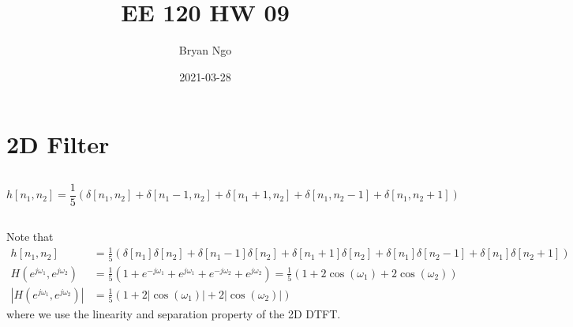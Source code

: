 \documentclass{article}
\title{EE 120 HW 09}
\author{Bryan Ngo}
\date{2021-03-28}
\begin{document}
\maketitle

\section{2D Filter}

\subsection{}

\begin{equation}
    h[n_1, n_2] = \frac{1}{5} (\delta[n_1, n_2] + \delta[n_1 - 1, n_2] + \delta[n_1 + 1, n_2] + \delta[n_1, n_2 - 1] + \delta[n_1, n_2 + 1])
\end{equation}

\subsection{}

Note that
\begin{align}
    h[n_1, n_2] &= \frac{1}{5} (\delta[n_1] \delta[n_2] + \delta[n_1 - 1] \delta[n_2] + \delta[n_1 + 1] \delta[n_2] + \delta[n_1] \delta[n_2 - 1] + \delta[n_1] \delta[n_2 + 1]) \\
    H(e^{j \omega_1}, e^{j \omega_2}) &= \frac{1}{5} (1 + e^{-j \omega_1} + e^{j \omega_1} + e^{-j \omega_2} + e^{j \omega_2}) = \frac{1}{5} (1 + 2\cos(\omega_1) + 2\cos(\omega_2)) \\
    |H(e^{j \omega_1}, e^{j \omega_2})| &= \frac{1}{5} (1 + 2|\cos(\omega_1)| + 2|\cos(\omega_2)|)
\end{align}
where we use the linearity and separation property of the 2D DTFT.

\begin{center}
\end{center}
\end{document}

